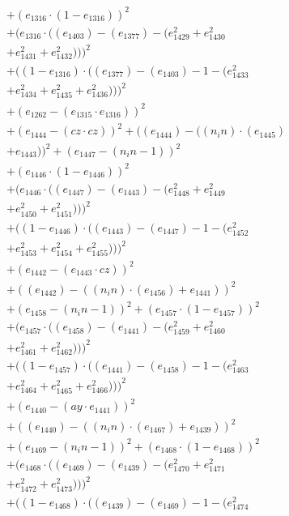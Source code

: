 \documentclass[10pt, a4paper]{article}
\begin{document}
\begin{align*}
& + (e_{1316}  \cdot  (1 - e_{1316}))^{2} \\
& + (e_{1316}  \cdot  ((e_{1403}) - (e_{1377}) - (e_{1429}^{2} + e_{1430}^{2} \\
& + e_{1431}^{2} + e_{1432}^{2})))^{2} \\
& + ((1 - e_{1316})  \cdot  ((e_{1377}) - (e_{1403}) - 1 - (e_{1433}^{2} \\
& + e_{1434}^{2} + e_{1435}^{2} + e_{1436}^{2})))^{2} \\
& + (e_{1262} - (e_{1315}  \cdot  e_{1316}))^{2} \\
& + (e_{1444} - (cz  \cdot  cz))^{2} + ((e_{1444}) - ((n_in)  \cdot  (e_{1445}) \\
& + e_{1443}))^{2} + (e_{1447} - (n_in - 1))^{2} \\
& + (e_{1446}  \cdot  (1 - e_{1446}))^{2} \\
& + (e_{1446}  \cdot  ((e_{1447}) - (e_{1443}) - (e_{1448}^{2} + e_{1449}^{2} \\
& + e_{1450}^{2} + e_{1451}^{2})))^{2} \\
& + ((1 - e_{1446})  \cdot  ((e_{1443}) - (e_{1447}) - 1 - (e_{1452}^{2} \\
& + e_{1453}^{2} + e_{1454}^{2} + e_{1455}^{2})))^{2} \\
& + (e_{1442} - (e_{1443}  \cdot  cz))^{2} \\
& + ((e_{1442}) - ((n_in)  \cdot  (e_{1456}) + e_{1441}))^{2} \\
& + (e_{1458} - (n_in - 1))^{2} + (e_{1457}  \cdot  (1 - e_{1457}))^{2} \\
& + (e_{1457}  \cdot  ((e_{1458}) - (e_{1441}) - (e_{1459}^{2} + e_{1460}^{2} \\
& + e_{1461}^{2} + e_{1462}^{2})))^{2} \\
& + ((1 - e_{1457})  \cdot  ((e_{1441}) - (e_{1458}) - 1 - (e_{1463}^{2} \\
& + e_{1464}^{2} + e_{1465}^{2} + e_{1466}^{2})))^{2} \\
& + (e_{1440} - (ay  \cdot  e_{1441}))^{2} \\
& + ((e_{1440}) - ((n_in)  \cdot  (e_{1467}) + e_{1439}))^{2} \\
& + (e_{1469} - (n_in - 1))^{2} + (e_{1468}  \cdot  (1 - e_{1468}))^{2} \\
& + (e_{1468}  \cdot  ((e_{1469}) - (e_{1439}) - (e_{1470}^{2} + e_{1471}^{2} \\
& + e_{1472}^{2} + e_{1473}^{2})))^{2} \\
& + ((1 - e_{1468})  \cdot  ((e_{1439}) - (e_{1469}) - 1 - (e_{1474}^{2} \\

\end{align*}
\end{document}
